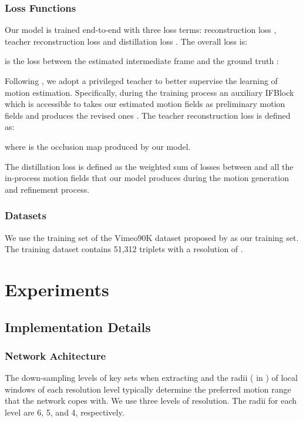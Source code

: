 \documentclass{article}
\begin{document}
\subsubsection{Loss Functions}
Our model is trained end-to-end with three loss terms: reconstruction loss , teacher reconstruction loss  and distillation loss . The overall loss  is:




 is the  loss between the estimated intermediate frame  and the ground truth :


Following \cite{rife}, we adopt a privileged teacher to better supervise the learning of motion estimation. Specifically, during the training process an auxiliary IFBlock \cite{rife} which is accessible to  takes our estimated motion fields  as preliminary motion fields and produces the revised ones  . The teacher reconstruction loss is defined as:

where  is the occlusion map produced by our model.

The distillation loss is defined as the weighted sum of  losses between  and all the in-process motion fields that our model produces during the motion generation and refinement process.

\subsubsection{Datasets}
We use the training set of the Vimeo90K dataset proposed by \cite{toflow} as our training set. The training dataset contains 51,312 triplets with a resolution of .





\section{Experiments}

\subsection{Implementation Details}

\subsubsection{Network Achitecture}

The down-sampling levels of key sets when extracting  and the radii ( in ) of local windows of each resolution level typically determine the preferred motion range that the network copes with. We use three levels of resolution. The radii for each level are 6, 5, and 4, respectively.
\end{document}

